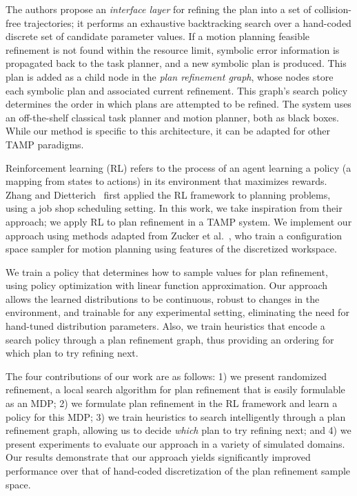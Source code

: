 The authors propose an \emph{interface layer} for refining the plan into a set
of collision-free trajectories; it performs an exhaustive
backtracking search over a hand-coded discrete set of candidate parameter values. If a motion
planning feasible refinement is not found within the resource limit,
symbolic error information is propagated back to the task planner, and a new symbolic plan is produced.
This plan is added as a child node in the \emph{plan refinement graph}, whose nodes store each
symbolic plan and associated current refinement. This graph's search policy determines the order
in which plans are attempted to be refined. The system uses an off-the-shelf classical task planner and motion planner, both as black boxes.
While our method is specific to this architecture, it can be adapted for other TAMP paradigms.

Reinforcement learning (RL) refers to the process of an agent learning a policy (a mapping from states to actions)
in its environment that maximizes rewards. Zhang and Dietterich~\cite{JobShopSched} first applied the RL framework
to planning problems, using a job shop scheduling setting. In this work, we take inspiration from
their approach; we apply RL to plan refinement in a TAMP system. We implement our approach using methods adapted from
Zucker et al.~\cite{workspacebias}, who train a configuration space sampler for motion planning
using features of the discretized workspace.

We train a policy that determines how to sample values for plan refinement, using policy optimization with linear function
approximation. Our approach allows the learned distributions to be continuous, robust to changes in
the environment, and trainable for any experimental setting, eliminating the need for hand-tuned
distribution parameters. Also, we train heuristics that encode a search policy through a plan refinement graph,
thus providing an ordering for which plan to try refining next.

The four contributions of our work are as follows: 1) we present randomized refinement, a local search
algorithm for plan refinement that is easily formulable as an MDP; 2) we formulate plan refinement in the
RL framework and learn a policy for this MDP; 3) we train heuristics to search intelligently
through a plan refinement graph, allowing us to decide \emph{which} plan to try refining next;
and 4) we present experiments to evaluate our approach in a variety of simulated
domains. Our results demonstrate that our approach yields significantly improved
performance over that of hand-coded discretization of the plan refinement sample space.

